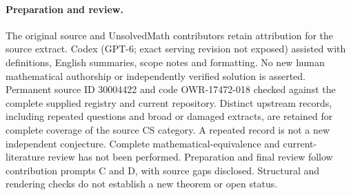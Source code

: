 \documentclass[11pt]{article}
\begin{document}
\paragraph{Preparation and review.}
The original source and UnsolvedMath contributors retain attribution for the source extract. Codex (GPT-6; exact serving revision not exposed) assisted with definitions, English summaries, scope notes and formatting. No new human mathematical authorship or independently verified solution is asserted. Permanent source ID 30004422 and code OWR-17472-018 checked against the complete supplied registry and current repository. Distinct upstream records, including repeated questions and broad or damaged extracts, are retained for complete coverage of the source CS category. A repeated record is not a new independent conjecture. Complete mathematical-equivalence and current-literature review has not been performed. Preparation and final review follow contribution prompts C and D, with source gaps disclosed. Structural and rendering checks do not establish a new theorem or open status.
\label{end:30004422}
\end{document}
